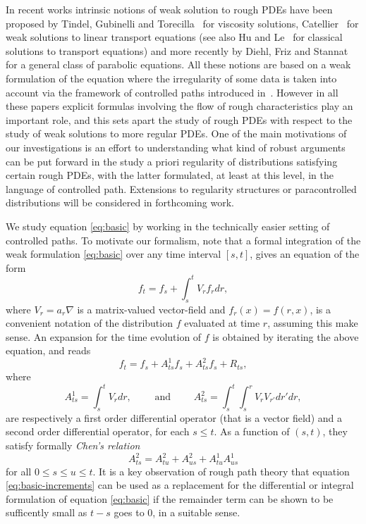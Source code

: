 \documentclass[11pt,a4paper]{amsart}
\renewcommand{\leq}{\leqslant}
\newcommand{\ssk}{\smallskip}
\numberwithin{equation}{section} %
\begin{document}
\ssk

In recent works intrinsic notions of weak solution to rough PDEs have been proposed by Tindel, Gubinelli and Torecilla~\cite{GTT} for viscosity solutions,  Catellier~\cite{CatellierTransport} for weak solutions to linear transport equations (see also Hu and Le~\cite{HuLe} for classical solutions to transport equations) and more recently by Diehl, Friz and Stannat~\cite{DiehlFrizStannat} for a general class of parabolic equations. All these notions are based on a weak formulation of the equation where the irregularity of some data is taken into account via the framework of controlled paths introduced in~\cite{Gubinelli04}. However in all these papers explicit formulas involving the flow of rough characteristics play an important role, and this sets apart the study of rough PDEs with respect to the study of weak solutions to more regular PDEs. One of the main motivations of our investigations is an effort to understanding what kind of robust arguments can be put forward in the study a priori regularity of distributions satisfying certain rough PDEs, with the latter formulated, at least at this level, in the language of controlled path. Extensions to regularity structures or paracontrolled distributions will be considered in forthcoming work. 

\bigskip

We study equation \eqref{eq:basic} by working in the technically easier setting of controlled paths. To motivate our formalism, note that a formal integration of the weak formulation \eqref{eq:basic} over any time interval $[s,t]$, gives an equation of the form
$$
f_t = f_s + \int_s^t V_r f_r dr, 
$$ 
where $V_r = a_r\nabla$ is a matrix-valued vector-field and $f_r(x) = f(r,x)$, is a convenient notation of the distribution $f$ evaluated at time $r$, assuming this make sense. An expansion for the time evolution of $f$ is obtained by iterating the above equation, and reads
\begin{equation}
\label{eq:basic-increments}
f_t = f_s + A^1_{ts} f_s + A^2_{ts} f_s + R_{ts},
\end{equation}
where
$$
A^1_{ts} = \int_s^t V_r  dr,\qquad\textrm{ and }\qquad A^2_{ts} = \int_s^t \int_s^r V_r V_{r'} dr' dr,
$$
are respectively a first order differential operator (that is a vector field) and a second order differential operator, for each $s\leq t$. As a function of $(s,t)$, they satisfy formally \textit{Chen's relation}
\begin{equation}
\label{eq:operator-chen}
A^2_{ts} =A^2_{tu}+ A^2_{us} + A^{1}_{tu}A^{1}_{us}
\end{equation}
for all $0\le s \le u \le t$. It is a key observation of rough path theory that equation \eqref{eq:basic-increments} can be used as a replacement for the differential or integral formulation 
of equation \eqref{eq:basic} if the remainder term can be shown to be sufficently small as $t-s$ goes to $0$, in a suitable sense.
\end{document}
